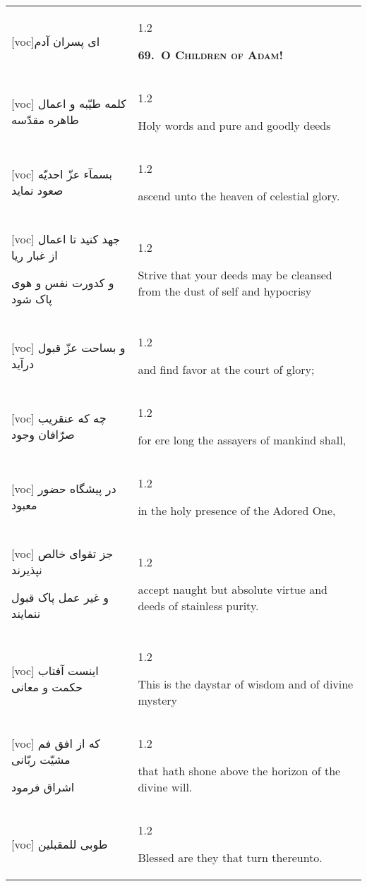 \documentclass[11pt]{article}
\makeatletter
\newenvironment{orig}
  {\begin{farsi}[voc]}
  {\end{farsi}}
\newenvironment{trans}
  {\Large\begin{spacing}{1.2}\raggedright}
  {\end{spacing}}
\newenvironment{word}
  {\begin{tabular}[t]{p{2.75in}@{\hspace{3em}}p{2.875in}}}
  {\end{tabular}}
\newcommand{\ayat}[2]{\begin{orig}#1\end{orig} & \begin{trans}#2\end{trans}}
\newcommand{\heading}[2]{\textsc{\textbf{#1}} %
}
\makeatother
\begin{document}
\begin{word}
\ayat{ای پسران آدم}{\heading{69.~O Children of Adam!}{}} \\ \ayat{
کلمه طيّبه و اعمال طاهره مقدّسه
}{Holy words and pure and goodly deeds} \vspace{-1ex}\\ \ayat{
بسمآء عزّ احديّه صعود نمايد
}{ascend unto the heaven of celestial glory.} \vspace{-1ex}\\ \ayat{
جهد کنيد تا اعمال از غبار ريا

و کدورت نفس و هوی پاک شود
}{Strive that your deeds may be cleansed from the dust of self and
  hypocrisy} \vspace{-1ex}\\ \ayat{
و بساحت عزّ قبول درآيد
}{and find favor at the court of glory;} \vspace{-1ex}\\ \ayat{
چه که عنقريب صرّافان وجود
}{for ere long the assayers of mankind shall,} \vspace{-1ex}\\ \ayat{
در پيشگاه حضور معبود
}{in the holy presence of the Adored One,} \vspace{-1ex}\\ \ayat{
جز تقوای خالص نپذيرند

و غير عمل پاک قبول ننمايند
}{accept naught but absolute virtue and deeds of stainless
  purity.} \vspace{-1ex}\\ \ayat{
اينست آفتاب حکمت و معانی
}{This is the daystar of wisdom and of divine mystery} \vspace{-1ex}\\ \ayat{
که از افق فم مشيّت ربّانی

اشراق فرمود
}{that hath shone above the horizon of the divine will.} \vspace{-1ex}\\ \ayat{
طوبی للمقبلين
}{Blessed are they that turn thereunto.}
\end{word}

\pagebreak
\end{document}
